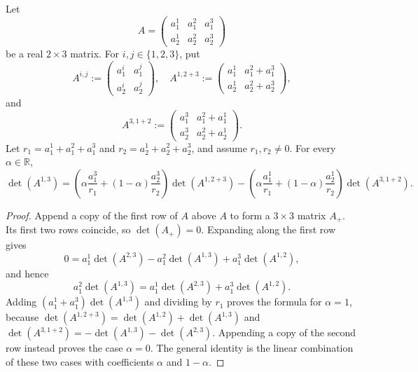 \documentclass[12pt]{article}
\begin{document}
\begin{lemma}\label{lem:matrix-identity}
Let
\begin{equation}\label{eq:display-021}
A=\begin{pmatrix}a_1^1&a_1^2&a_1^3\\a_2^1&a_2^2&a_2^3\end{pmatrix}
\end{equation}
be a real $2\times3$ matrix.  For $i,j\in\{1,2,3\}$, put
\begin{equation}\label{eq:display-022}
A^{i,j}:=\begin{pmatrix}a_1^i&a_1^j\\a_2^i&a_2^j\end{pmatrix},
\quad
A^{1,2+3}:=\begin{pmatrix}a_1^1&a_1^2+a_1^3\\
a_2^1&a_2^2+a_2^3\end{pmatrix},
\end{equation}
and
\begin{equation}\label{eq:display-023}
A^{3,1+2}:=\begin{pmatrix}a_1^3&a_1^2+a_1^1\\
a_2^3&a_2^2+a_2^1\end{pmatrix}.
\end{equation}
Let $r_1=a_1^1+a_1^2+a_1^3$ and
$r_2=a_2^1+a_2^2+a_2^3$, and assume $r_1,r_2\ne0$.  For every
$\alpha\in\mathbb R$,
\begin{equation}\label{eq:display-024}
\det(A^{1,3})=
\left(\alpha\frac{a_1^3}{r_1}+(1-\alpha)\frac{a_2^3}{r_2}\right)
\det(A^{1,2+3})
-\left(\alpha\frac{a_1^1}{r_1}+(1-\alpha)\frac{a_2^1}{r_2}\right)
\det(A^{3,1+2}).
\end{equation}
\end{lemma}

\begin{proof}
Append a copy of the first row of $A$ above $A$ to form a $3\times3$
matrix $A_+$.  Its first two rows coincide, so $\det(A_+)=0$.  Expanding
along the first row gives
\begin{equation}\label{eq:display-025}
0=a_1^1\det(A^{2,3})-a_1^2\det(A^{1,3})+a_1^3\det(A^{1,2}),
\end{equation}
and hence
\begin{equation}\label{eq:display-026}
a_1^2\det(A^{1,3})=a_1^1\det(A^{2,3})+a_1^3\det(A^{1,2}).
\end{equation}
Adding $(a_1^1+a_1^3)\det(A^{1,3})$ and dividing by $r_1$ proves the
formula for $\alpha=1$, because
$\det(A^{1,2+3})=\det(A^{1,2})+\det(A^{1,3})$ and
$\det(A^{3,1+2})=-\det(A^{1,3})-\det(A^{2,3})$.  Appending a copy of the second
row instead proves the case $\alpha=0$.  The general identity is the
linear combination of these two cases with coefficients $\alpha$ and
$1-\alpha$.
\end{proof}
\end{document}
